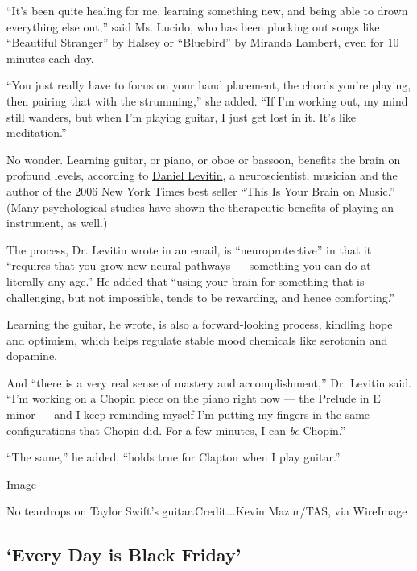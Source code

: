``It's been quite healing for me, learning something new, and being able
to drown everything else out,'' said Ms. Lucido, who has been plucking
out songs like
\href{https://www.youtube.com/watch?v=ONS51QzCh1Y}{``Beautiful
Stranger''} by Halsey or
\href{https://www.youtube.com/watch?v=nUB8ogvze_8}{``Bluebird''} by
Miranda Lambert, even for 10 minutes each day.

``You just really have to focus on your hand placement, the chords
you're playing, then pairing that with the strumming,'' she added. ``If
I'm working out, my mind still wanders, but when I'm playing guitar, I
just get lost in it. It's like meditation.''

No wonder. Learning guitar, or piano, or oboe or bassoon, benefits the
brain on profound levels, according to
\href{https://www.daniellevitin.com/}{Daniel Levitin}, a neuroscientist,
musician and the author of the 2006 New York Times best seller
\href{https://www.nytimes3xbfgragh.onion/2006/12/31/arts/music/31thom.html}{``This
Is Your Brain on Music.''} (Many
\href{https://www.cambridgebrainsciences.com/more/articles/playing-a-musical-instrument-can-have-immediate-brain-benefits}{psychological}
\href{https://journals.sagepub.com/doi/abs/10.1177/0255761411408505}{studies}
have shown the therapeutic benefits of playing an instrument, as well.)

The process, Dr. Levitin wrote in an email, is ``neuroprotective'' in
that it ``requires that you grow new neural pathways --- something you
can do at literally any age.'' He added that ``using your brain for
something that is challenging, but not impossible, tends to be
rewarding, and hence comforting.''

Learning the guitar, he wrote, is also a forward-looking process,
kindling hope and optimism, which helps regulate stable mood chemicals
like serotonin and dopamine.

And ``there is a very real sense of mastery and accomplishment,'' Dr.
Levitin said. ``I'm working on a Chopin piece on the piano right now ---
the Prelude in E minor --- and I keep reminding myself I'm putting my
fingers in the same configurations that Chopin did. For a few minutes, I
can \emph{be} Chopin.''

``The same,'' he added, ``holds true for Clapton when I play guitar.''

Image

No teardrops on Taylor Swift's guitar.Credit...Kevin Mazur/TAS, via
WireImage

\hypertarget{every-day-is-black-friday}{%
\subsection{`Every Day is Black
Friday'}\label{every-day-is-black-friday}}

